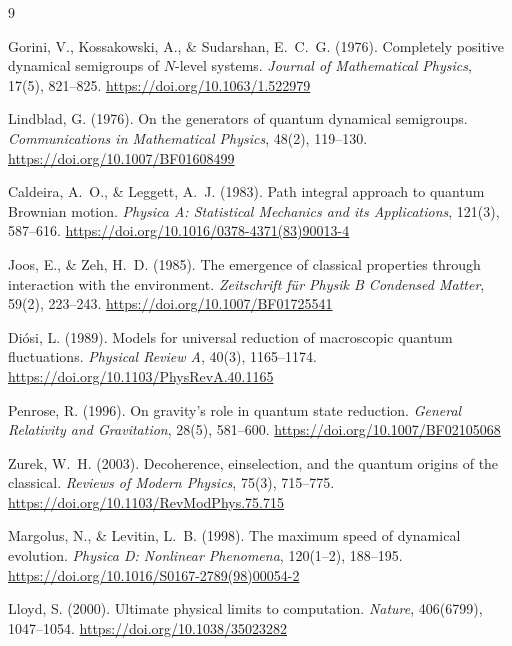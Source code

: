 \documentclass[11pt,a4paper]{article}
\begin{document}
\begin{thebibliography}{9}

Gorini, V., Kossakowski, A., \& Sudarshan, E.~C.~G. (1976).
Completely positive dynamical semigroups of $N$-level systems.
\emph{Journal of Mathematical Physics}, 17(5), 821--825.
\url{https://doi.org/10.1063/1.522979}

Lindblad, G. (1976).
On the generators of quantum dynamical semigroups.
\emph{Communications in Mathematical Physics}, 48(2), 119--130.
\url{https://doi.org/10.1007/BF01608499}

Caldeira, A.~O., \& Leggett, A.~J. (1983).
Path integral approach to quantum Brownian motion.
\emph{Physica A: Statistical Mechanics and its Applications}, 121(3), 587--616.
\url{https://doi.org/10.1016/0378-4371(83)90013-4}

Joos, E., \& Zeh, H.~D. (1985).
The emergence of classical properties through interaction with the environment.
\emph{Zeitschrift f\"ur Physik B Condensed Matter}, 59(2), 223--243.
\url{https://doi.org/10.1007/BF01725541}

Di\'osi, L. (1989).
Models for universal reduction of macroscopic quantum fluctuations.
\emph{Physical Review A}, 40(3), 1165--1174.
\url{https://doi.org/10.1103/PhysRevA.40.1165}

Penrose, R. (1996).
On gravity's role in quantum state reduction.
\emph{General Relativity and Gravitation}, 28(5), 581--600.
\url{https://doi.org/10.1007/BF02105068}

Zurek, W.~H. (2003).
Decoherence, einselection, and the quantum origins of the classical.
\emph{Reviews of Modern Physics}, 75(3), 715--775.
\url{https://doi.org/10.1103/RevModPhys.75.715}

Margolus, N., \& Levitin, L.~B. (1998).
The maximum speed of dynamical evolution.
\emph{Physica D: Nonlinear Phenomena}, 120(1--2), 188--195.
\url{https://doi.org/10.1016/S0167-2789(98)00054-2}

Lloyd, S. (2000).
Ultimate physical limits to computation.
\emph{Nature}, 406(6799), 1047--1054.
\url{https://doi.org/10.1038/35023282}

\end{thebibliography}
\end{document}
